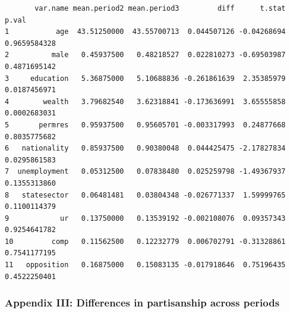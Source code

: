 \documentclass[
  letterpaper,
  DIV=11,
  numbers=noendperiod]{scrartcl}
\begin{document}
\begin{verbatim}
       var.name mean.period2 mean.period3         diff      t.stat        p.val
1           age  43.51250000  43.55700713  0.044507126 -0.04268694 0.9659584328
2          male   0.45937500   0.48218527  0.022810273 -0.69503987 0.4871695142
3     education   5.36875000   5.10688836 -0.261861639  2.35385979 0.0187456971
4        wealth   3.79682540   3.62318841 -0.173636991  3.65555858 0.0002683031
5       permres   0.95937500   0.95605701 -0.003317993  0.24877668 0.8035775682
6   nationality   0.85937500   0.90380048  0.044425475 -2.17827834 0.0295861583
7  unemployment   0.05312500   0.07838480  0.025259798 -1.49367937 0.1355313860
8   statesector   0.06481481   0.03804348 -0.026771337  1.59999765 0.1100114379
9            ur   0.13750000   0.13539192 -0.002108076  0.09357343 0.9254641782
10         comp   0.11562500   0.12232779  0.006702791 -0.31328861 0.7541177195
11   opposition   0.16875000   0.15083135 -0.017918646  0.75196435 0.4522250401
\end{verbatim}

\subsubsection{Appendix III: Differences in partisanship across
periods}\label{appendix-iii-differences-in-partisanship-across-periods}
\end{document}
